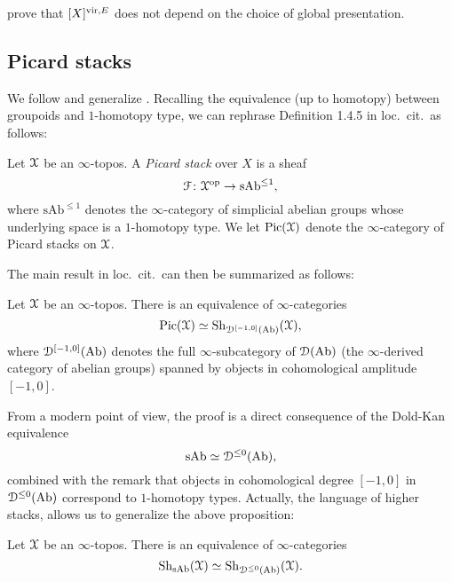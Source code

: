 \begin{rem}
\cite{Behrend_Intrinsic_normal_cone_1997} prove that $[X]^{\operatorname{vir},E}$ does not depend on the choice of global presentation.
\end{rem}




\subsection{Picard stacks}
\label{subsect:picard}

We follow and generalize \cite[Expos\'e XVIII, \S 1.4]{SGA4}.
Recalling the equivalence (up to homotopy) between groupoids and $1$-homotopy type, we can rephrase 
Definition 1.4.5 in loc.\ cit.\ as follows:

\begin{defin}
	Let $\mathcal X$ be an $\infty$-topos.
	A \emph{Picard stack} over $X$ is a sheaf
	\[ \mathcal F \colon \mathcal X^{\mathrm{op}} \to \mathrm{sAb}^{\le 1} , \]
	where $\mathrm{sAb}^{\le 1}$ denotes the $\infty$-category of simplicial abelian groups whose underlying space is a $1$-homotopy type.
	We let $\mathrm{Pic}(\mathcal X)$ denote the $\infty$-category of Picard stacks on $\mathcal X$.
\end{defin}

The main result in loc.\ cit.\ can then be summarized as follows:

\begin{prop}
	Let $\mathcal X$ be an $\infty$-topos.
	There is an equivalence of $\infty$-categories
	\[ \mathrm{Pic}(\mathcal X) \simeq \mathrm{Sh}_{\mathcal D^{[-1,0]}(\mathrm{Ab})}(\mathcal X) , \]
	where $\mathcal D^{[-1,0]}(\mathrm{Ab})$ denotes the full $\infty$-subcategory of $\mathcal D(\mathrm{Ab})$ (the $\infty$-derived category of abelian groups) spanned by objects in cohomological amplitude $[-1,0]$.
\end{prop}

From a modern point of view, the proof is a direct consequence of the Dold-Kan equivalence
\[ \mathrm{sAb} \simeq \mathcal D^{\le 0}(\mathrm{Ab}) , \]
combined with the remark that objects in cohomological degree $[-1,0]$ in $\mathcal D^{\le 0}(\mathrm{Ab})$ correspond to $1$-homotopy types.
Actually, the language of higher stacks, allows us to generalize the above proposition:

\begin{prop}
	Let $\mathcal X$ be an $\infty$-topos.
	There is an equivalence of $\infty$-categories
	\[ \mathrm{Sh}_{\mathrm{sAb}}(\mathcal X) \simeq \mathrm{Sh}_{\mathcal D^{\le 0}(\mathrm{Ab})}(\mathcal X) . \]
\end{prop}

